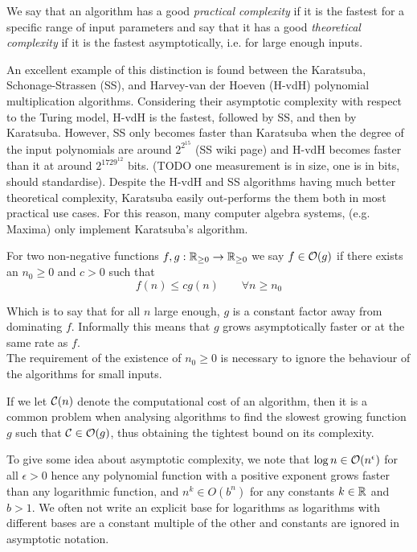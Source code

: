 We say that an algorithm has a good \textit{practical complexity} if it is the fastest for a specific range of input parameters and say that it has a good \textit{theoretical complexity} if it is the fastest asymptotically, i.e. for large enough inputs.

An excellent example of this distinction is found between the Karatsuba, Schonage-Strassen (SS), and Harvey-van der Hoeven (H-vdH) polynomial multiplication algorithms. Considering their asymptotic complexity with respect to the Turing model, H-vdH is the fastest, followed by SS, and then by Karatsuba. However, SS only becomes faster than Karatsuba when the degree of the input polynomials are around $2^{2^{15}}$ (SS wiki page) and H-vdH becomes faster than it at around $2^{1729^{12}}$ bits. (TODO one measurement is in size, one is in bits, should standardise). Despite the H-vdH and SS algorithms having much better theoretical complexity, Karatsuba easily out-performs the them both in most practical use cases. For this reason, many computer algebra systems, (e.g. Maxima) only implement Karatsuba's algorithm.

\begin{definition}
    For two non-negative functions $f, g: {\mathbb R}_{\ge 0} \to {\mathbb R}_{\ge 0}$ we say $f \in \mathcal O(g)$ if there exists an $n_0 \ge 0$ and $c > 0$ such that
    \begin{equation}\label{eq:big-o}
        f(n) \le cg(n) \qquad \forall n \ge n_0
    \end{equation}
\end{definition}
Which is to say that for all $n$ large enough, $g$ is a constant factor away from dominating $f$. Informally this means that $g$ grows asymptotically faster or at the same rate as $f$.\\
The requirement of the existence of $n_0 \ge 0$ is necessary to ignore the behaviour of the algorithms for small inputs.

If we let $\mathcal C(n)$ denote the computational cost of an algorithm, then it is a common problem when analysing algorithms to find the slowest growing function $g$ such that $\mathcal C \in \mathcal O(g)$, thus obtaining the tightest bound on its complexity.

To give some idea about asymptotic complexity, we note that $\log n \in \mathcal O(n^\epsilon)$ for all $\epsilon > 0$ hence any polynomial function with a positive exponent grows faster than any logarithmic function, and $n^k \in O(b^n)$ for any constants $k \in {\mathbb R}$ and $b > 1$. We often not write an explicit base for logarithms as logarithms with different bases are a constant multiple of the other and constants are ignored in asymptotic notation.

